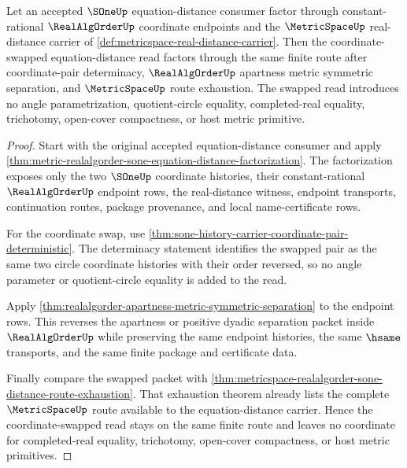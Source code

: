 \begin{theorem}
\label{thm:metric-realalgorder-sone-equation-distance-symmetry}
Let an accepted $\SOneUp$ equation-distance consumer factor through
constant-rational $\RealAlgOrderUp$ coordinate endpoints and the
$\MetricSpaceUp$ real-distance carrier of
\autoref{def:metricspace-real-distance-carrier}. Then the coordinate-swapped
equation-distance read factors through the same finite route after
coordinate-pair determinacy, $\RealAlgOrderUp$ apartness metric symmetric
separation, and $\MetricSpaceUp$ route exhaustion. The swapped read introduces
no angle parametrization, quotient-circle equality, completed-real equality,
trichotomy, open-cover compactness, or host metric primitive.
\end{theorem}
\begin{proof}
Start with the original accepted equation-distance consumer and apply
\autoref{thm:metric-realalgorder-sone-equation-distance-factorization}. The
factorization exposes only the two $\SOneUp$ coordinate histories, their
constant-rational $\RealAlgOrderUp$ endpoint rows, the real-distance witness,
endpoint transports, continuation routes, package provenance, and local
name-certificate rows.

For the coordinate swap, use
\autoref{thm:sone-history-carrier-coordinate-pair-deterministic}. The
determinacy statement identifies the swapped pair as the same two circle
coordinate histories with their order reversed, so no angle parameter or
quotient-circle equality is added to the read.

Apply
\autoref{thm:realalgorder-apartness-metric-symmetric-separation} to the
endpoint rows. This reverses the apartness or positive dyadic separation
packet inside $\RealAlgOrderUp$ while preserving the same endpoint histories,
the same $\hsame$ transports, and the same finite package and certificate
data.

Finally compare the swapped packet with
\autoref{thm:metricspace-realalgorder-sone-distance-route-exhaustion}. That
exhaustion theorem already lists the complete $\MetricSpaceUp$ route available
to the equation-distance carrier. Hence the coordinate-swapped read stays on
the same finite route and leaves no coordinate for completed-real equality,
trichotomy, open-cover compactness, or host metric primitives.
\end{proof}

